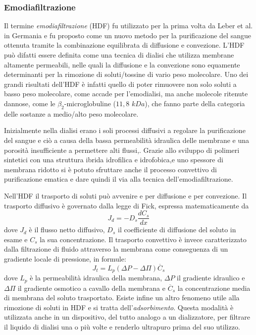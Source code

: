 \subsubsection{Emodiafiltrazione}
Il termine \textit{emodiafiltrazione} (HDF) fu utilizzato per la prima volta da Leber et al. \cite{leber} in Germania e fu proposto come un nuovo metodo per la purificazione del sangue ottenuta tramite la combinazione equilibrata di diffusione e convezione.
L'HDF può difatti essere definita come una tecnica di dialisi che utilizza membrane altamente permeabili, nelle quali la diffusione e la convezione sono equamente determinanti per la rimozione di soluti/tossine di vario peso molecolare.
Uno dei grandi risultati dell'HDF è infatti quello di poter rimuovere non solo soluti a basso peso molecolare, come accade per l'emodialisi, ma anche molecole ritenute dannose, come le $\beta_2$-microglobuline ($11,8$ $kDa$), che fanno parte della categoria delle sostanze a medio/alto peso molecolare.

Inizialmente nella dialisi erano i soli processi diffusivi a regolare la purificazione del sangue e ciò a causa della bassa permeabilità idraulica delle membrane e una porosità insufficiente a permettere alti flussi,. Grazie allo sviluppo di polimeri sintetici con una struttura ibrida idrofilica e idrofobica,e uno spessore di membrana ridotto si è potuto sfruttare anche il processo convettivo di purificazione ematica e dare quindi il via alla tecnica dell'emodiafiltrazione.

Nell'HDF  il trasporto di soluti può avvenire e per diffusione e per convezione. Il trasporto diffusivo è governato dalla legge di Fick, espressa matematicamente da $$J_d = -D_s \frac{dC_s}{dx}$$
dove $J_d$ è il flusso netto diffusivo, $D_s$ il coefficiente di diffusione del soluto in esame e $C_s$ la sua concentrazione.
Il trasporto convettivo è invece caratterizzato dalla filtrazione di fluido attraverso la membrana come conseguenza di un gradiente locale di pressione, in formule:
$$J_t = L_p (\Delta P - \Delta\Pi)\overline{C}_s$$
dove $L_p$ è la permeabilità idraulica della membrana, $\Delta P$ il gradiente idraulico e $\Delta \Pi$ il gradiente osmotico a cavallo della membrana e  $\overline{C}_s$ la concentrazione media di membrana del soluto trasportato.
Esiste infine un altro fenomeno utile alla rimozione di soluti in HDF e si tratta dell'\textit{adsorbimento}. Questa modalità è utilizzata anche in un dispositivo, del tutto analogo a un dializzatore, per filtrare il liquido di dialisi una o più volte e renderlo ultrapuro prima del suo utilizzo.

